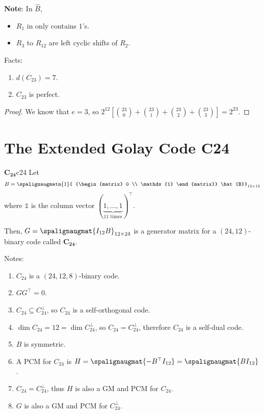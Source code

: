 \textbf{Note}: In $ \hat{B} $,
\begin{itemize}
    \item $ R_1 $ in only contains $ 1 $'s.
    \item $ R_3 $ to $ R_{12} $ are left cyclic shifts of $ R_2 $.
\end{itemize}

\begin{Theorem}{}{}
    Facts:
    \begin{enumerate}
        \item $ d(C_{23})=7 $.
        \item $ C_{23} $ is perfect.
    \end{enumerate}
\end{Theorem}

\begin{proof}
    We know that $ e=3 $, so
    $ 2^{12}\left[ \binom{23}{0}+\binom{23}{1}+\binom{23}{2}+\binom{23}{3} \right]=
        2^{23} $.
\end{proof}

\section{The Extended Golay Code C24}
\begin{Definition}{$ \bm{C_{24}} $}{c24}
    Let
    \[ B=\spalignaugmatn{1}{
            {\begin{matrix}
                        0 \\
                        \mathds{1}
                    \end{matrix}}
            \hat{B}}_{12\times{} 12}
    \]
    where $ \mathds{1} $ is the column vector $ (\underbrace{1,\ldots ,1}_{11\text{ times}})^\top $.

    Then, $ G=\spalignaugmat{I_{12} B}_{12\times 24} $ is a generator
    matrix for a $ (24,12) $-binary code called $ \bm{C_{24}} $.
\end{Definition}

Notes:
\begin{enumerate}[label=(\arabic*)]
    \item $ C_{24} $ is a $ (24,12,8) $-binary code.
    \item $ GG^\top=0 $.
    \item $ C_{24}\subseteq C_{24}^\perp $,
          so $ C_{24} $ is a self-orthogonal code.
    \item $ \dim{C_{24}}=12=\dim{C_{24}^\perp} $, so
          $ C_{24}=C_{24}^\perp $, therefore $ C_{24} $ is a self-dual code.
    \item $ B $ is symmetric.
    \item A PCM for $ C_{24} $ is $ H=\spalignaugmat{{-B^\top} I_{12}}=
              \spalignaugmat{B I_{12}} $.
    \item $ C_{24}=C_{24}^\perp $, thus $ H $ is also a GM and PCM for $ C_{24} $.
    \item $ G $ is also a GM and PCM for $ C_{24}^\perp $.
\end{enumerate}

